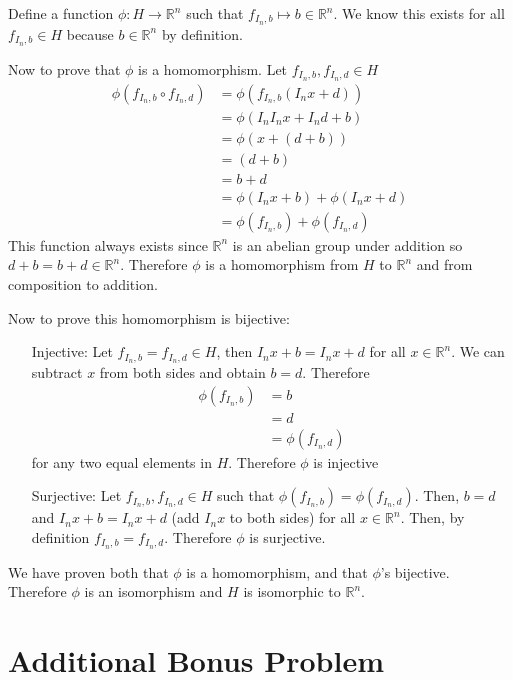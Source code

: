 \documentclass[12pt,letterpaper]{article}
\begin{document}
\begin{enumerate}
    Define a function $\phi: H \rightarrow \mathbb{R}^n$ such that $f_{I_n,b} \mapsto b\in \mathbb{R}^n$. We know this exists for all $f_{I_n,b}\in H$ because $b\in\mathbb{R}^n$ by definition. 
    
    Now to prove that $\phi$ is a homomorphism. Let $f_{I_n,b},f_{I_n,d}\in H$
    \begin{align*}
        \phi(f_{I_n,b}\circ f_{I_n,d}) &= \phi(f_{I_n,b}(I_nx+d))\\
        &= \phi(I_nI_nx + I_nd + b)\\
        &= \phi(x+(d+b))\\
        &= (d+b)\\
        &= b+d\\
        &= \phi(I_nx+b)+\phi(I_nx+d)\\
        &= \phi(f_{I_n,b})+\phi(f_{I_n,d})
    \end{align*}
    This function always exists since $\mathbb{R}^n$ is an abelian group under addition so $d+b=b+d\in \mathbb{R}^n$. Therefore $\phi$ is a homomorphism from $H$ to $\mathbb{R}^n$ and from composition to addition.
    
    Now to prove this homomorphism is bijective:
    \begin{itemize}
        \item [Injective:] Let $f_{I_n,b}=f_{I_n,d}\in H$, then $I_nx+b=I_nx + d$ for all $x\in\mathbb{R}^n$. We can subtract $x$ from both sides and obtain $b=d$. Therefore
        \begin{align*}
            \phi(f_{I_n,b}) &= b\\
            &= d\\
            &= \phi(f_{I_n,d})
        \end{align*}
        for any two equal elements in $H$. Therefore $\phi$ is injective
        \item [Surjective:] Let $f_{I_n,b},f_{I_n,d}\in H$ such that $\phi(f_{I_n,b})=\phi(f_{I_n,d})$. Then, $b=d$ and $I_nx+b=I_nx+d$ (add $I_nx$ to both sides) for all $x\in\mathbb{R}^n$. Then, by definition $f_{I_n,b}=f_{I_n,d}$. Therefore $\phi$ is surjective.
    \end{itemize}
    We have proven both that $\phi$ is a homomorphism, and that $\phi$'s bijective. Therefore $\phi$ is an isomorphism and $H$ is isomorphic to $\mathbb{R}^n$.
    
\end{enumerate}
\newpage

\section*{Additional Bonus Problem}
\end{document}
